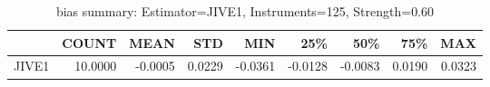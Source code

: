 \begin{table}[ht]
\centering
\caption{bias summary: Estimator=JIVE1, Instruments=125, Strength=0.60}
\begin{tabular}{lrrrrrrrr}
\toprule
 & COUNT & MEAN & STD & MIN & 25\% & 50\% & 75\% & MAX \\
\midrule
JIVE1 & 10.0000 & -0.0005 & 0.0229 & -0.0361 & -0.0128 & -0.0083 & 0.0190 & 0.0323 \\
\bottomrule
\end{tabular}
\end{table}
